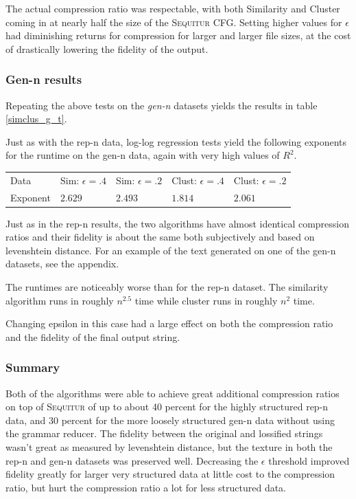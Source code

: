 \documentclass[11pt]{article}
\newcommand{\Sequitur}{\textsc{Sequitur}\xspace}
\begin{document}
The actual compression ratio was respectable, with both Similarity and Cluster
coming in at nearly half the size of the \Sequitur CFG.  Setting higher values
for $\epsilon$ had diminishing returns for compression for larger and larger
file sizes, at the cost of drastically lowering the fidelity of the output.

\subsubsection{Gen-n results}

Repeating the above tests on the \emph{gen-n} datasets yields the results in
table \ref{simclus_g_t}.

Just as with the rep-n data, log-log regression tests yield the following
exponents for the runtime on the gen-n data, again with very high values of
$R^2$.

\begin{tabular}{l|l|l|l|l}
Data     & Sim: $\epsilon=.4$ & Sim: $\epsilon=.2$ & Clust: $\epsilon = .4$ & Clust: $\epsilon = .2$ \\
Exponent & $2.629$ & $2.493$ & $1.814$ & $2.061$
\end{tabular}

Just as in the rep-n results, the two algorithms have almost identical
compression ratios and their fidelity is about the same both subjectively and
based on levenshtein distance. For an example of the text generated on one of
the gen-n datasets, see the appendix.

The runtimes are noticeably worse than for the rep-n dataset. The similarity
algorithm runs in roughly $n^{2.5}$ time while cluster runs in roughly $n^2$
time.

Changing epsilon in this case had a large effect on both the compression ratio
and the fidelity of the final output string.

\subsubsection{Summary}

Both of the algorithms were able to achieve great additional compression ratios
on top of \Sequitur of up to about 40 percent for the highly structured rep-n
data, and 30 percent for the more loosely structured gen-n data without using
the grammar reducer. The fidelity between the original and lossified strings
wasn't great as measured by levenshtein distance, but the texture in both the
rep-n and gen-n datasets was preserved well. Decreasing the $\epsilon$
threshold improved fidelity greatly for larger very structured data at little
cost to the compression ratio, but hurt the compression ratio a lot for less
structured data.
\end{document}
